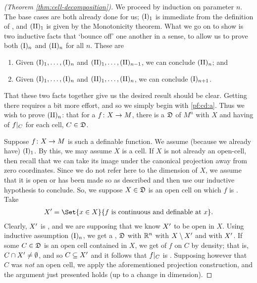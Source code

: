 \begin{proof}[\CD (Theorem \ref{thm:cell-decomposition})]
  We proceed by induction on parameter $n$. The base cases are both already done for us; $\In[1]$ is immediate from the definition of \omy, and $\IIn[1]$ is given by the Monotonicity theorem. What we go on to show is two inductive facts that `bounce off' one another in a sense, to allow us to prove both $\In$ and $\IIn$ for all $n$. These are
  \begin{enumerate}[label=(\alph*)]
    \item \label{pf:cd:a} Given $\In[1], \hdots, \In$ and $\IIn[1], \hdots, \IIn[n-1]$, we can conclude $\IIn$; and
    \item \label{pf:cd:b} Given $\In[1], \hdots, \In$ and $\IIn[1], \hdots, \IIn[n]$, we can conclude $\In[n+1]$.
  \end{enumerate}
  That these two facts together give us the desired result should be clear.
  Getting there requires a bit more effort, and so we simply begin with \ref{pf:cd:a}.
  Thus we wish to prove $\IIn[n]$: that for a  $\funcdom{f}{X}{M}$, there is a \cd $\fancyD$ of $M^n$ \cmptble with $X$ and having \contty of $\funcrestr{f}{C}$ for each cell, $C \in \fancyD$.

  Suppose $\funcdom{f}{X}{M}$ is such a definable function. We assume (because we already have) $\In[1]$. By this, we may assume $X$ is a cell. If $X$ is not already an open-cell, then recall that we can take its image under the canonical projection away from zero coordinates. Since we do not refer here to the dimension of $X$, we assume that it is open or has been made so as described and then use our inductive hypothesis to conclude. So, we suppose $X \in \fancyD$ is an open cell on which $f$ is \cont. Take
  \begin{align*}
	\Xprime = \Set{x \in X}{f \ \textrm{is \cont and \defnb at} \ x}.
  \end{align*}
  Clearly, $\Xprime$ is , and we are supposing that we know $\Xprime$ to be open in $X$. Using inductive assumption $\In[n]$, we get a \cd, $\fancyD$ with $\R^n$ \cmptble with $X \setminus \Xprime$ and with $\Xprime$. If some $C \in \fancyD$ is an open cell contained in $X$, we get \contty of $f$ on $C$  by density; that is, $C \cap \Xprime \neq \emptyset$, and so $C \subseteq \Xprime$ and it follows that $\funcrestr{f}{C}$ is \cont. Supposing however that $C$ was \emph{not} an open cell, we apply the aforementioned projection construction, and the argument just presented holds (up to a change in dimension).


\end{proof}
